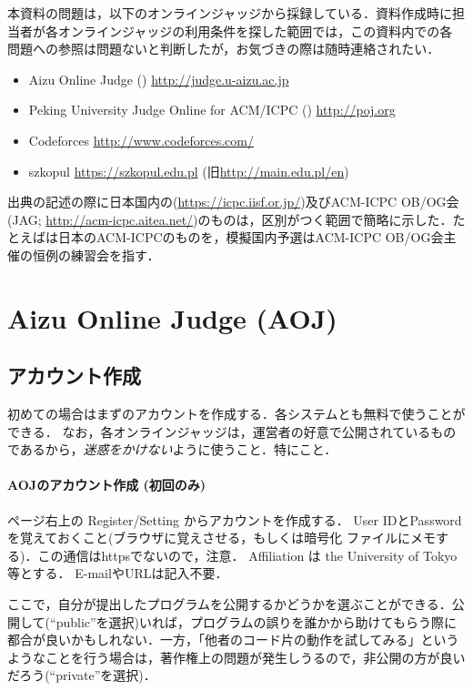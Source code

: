 本資料の問題は，以下のオンラインジャッジから採録している．資料作成時に担
当者が各オンラインジャッジの利用条件を探した範囲では，この資料内での各
問題への参照は問題ないと判断したが，お気づきの際は随時連絡されたい．

\begin{itemize}
\item Aizu Online Judge () \url{http://judge.u-aizu.ac.jp}
\item Peking University Judge Online for ACM/ICPC () \url{http://poj.org}
\item Codeforces \url{http://www.codeforces.com/}
\item szkopul \url{https://szkopul.edu.pl} (旧\url{http://main.edu.pl/en})
\end{itemize}

出典の記述の際に日本国内の(\url{https://icpc.iisf.or.jp/})及びACM-ICPC OB/OG会(JAG; \url{http://acm-icpc.aitea.net/})のものは，区別がつく範囲で簡略に示した．たとえばは日本のACM-ICPCのものを，模擬国内予選はACM-ICPC OB/OG会主催の恒例の練習会を指す．

\section{Aizu Online Judge (AOJ)}

\subsection*{アカウント作成}

初めての場合はまずのアカウントを作成する．各システムとも無料で使うことができる．
なお，各オンラインジャッジは，運営者の好意で公開されているものであるから，\emph{迷惑をかけない}ように使うこと．特にこと．

\paragraph{AOJのアカウント作成 (初回のみ)}
ページ右上の Register/Setting からアカウントを作成する．
User IDとPasswordを覚えておくこと(ブラウザに覚えさせる，もしくは暗号化
ファイルにメモする)．この通信はhttpsでないので，注意．
Affiliation は the University of Tokyo等とする． E-mailやURLは記入不要．

ここで，自分が提出したプログラムを公開するかどうかを選ぶことができる．公開して(``public''を選択)いれば，プログラムの誤りを誰かから助けてもらう際に都合が良いかもしれない．一方，「他者のコード片の動作を試してみる」というようなことを行う場合は，著作権上の問題が発生しうるので，非公開の方が良いだろう(``private''を選択)．

